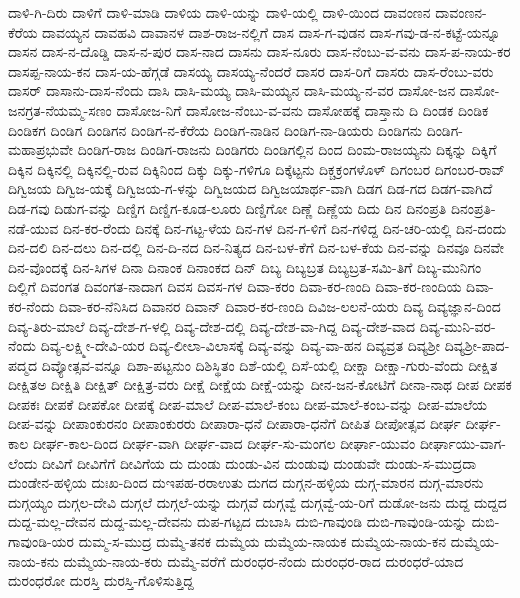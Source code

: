 ದಾಳಿ-ಗಿ-ದಿರು
ದಾಳಿಗೆ
ದಾಳಿ-ಮಾಡಿ
ದಾಳಿಯ
ದಾಳಿ-ಯನ್ನು
ದಾಳಿ-ಯಲ್ಲಿ
ದಾಳಿ-ಯಿಂದ
ದಾವಂಣನ
ದಾವಂಣನ-ಕೆರೆಯ
ದಾವಯ್ಯನ
ದಾವಹವಿ
ದಾವಾನಳ
ದಾಶ-ರಾಜ-ನಲ್ಲಿಗೆ
ದಾಸ
ದಾಸ-ಗ-ವುಡನ
ದಾಸ-ಗವು-ಡ-ನ-ಕಟ್ಟೆ-ಯನ್ನೂ
ದಾಸನ
ದಾಸ-ನ-ದೊಡ್ಡಿ
ದಾಸ-ನ-ಪುರ
ದಾಸ-ನಾದ
ದಾಸನು
ದಾಸ-ನೂರು
ದಾಸ-ನೆಂಬು-ವ-ವನು
ದಾಸ-ಪ-ನಾಯ-ಕರ
ದಾಸಪ್ಪ-ನಾಯ-ಕನ
ದಾಸ-ಯ-ಹೆಗ್ಗಡೆ
ದಾಸಯ್ಯ
ದಾಸಯ್ಯ-ನೆಂದರೆ
ದಾಸರ
ದಾಸ-ರಿಗೆ
ದಾಸರು
ದಾಸ-ರೆಂಬು-ವರು
ದಾಸರ್
ದಾಸಾನು-ದಾಸ-ನೆಂದು
ದಾಸಿ
ದಾಸಿ-ಮಯ್ಯ
ದಾಸಿ-ಮಯ್ಯನ
ದಾಸಿ-ಮಯ್ಯ-ನ-ವರ
ದಾಸೋ-ಜನ
ದಾಸೋ-ಜನಗ್ರತ-ನೆಯಮ್ಮ-ಸಣಂ
ದಾಸೋಜ-ನಿಗೆ
ದಾಸೋಜ-ನೆಂಬು-ವ-ವನು
ದಾಸೋಹಕ್ಕೆ
ದಾಸ್ತಾನು
ದಿ
ದಿಂಡಕ
ದಿಂಡಿಕ
ದಿಂಡಿಕಗ
ದಿಂಡಿಗ
ದಿಂಡಿಗನ
ದಿಂಡಿಗ-ನ-ಕೆರೆಯ
ದಿಂಡಿಗ-ನಾಡಿನ
ದಿಂಡಿಗ-ನಾ-ಡಿಯರು
ದಿಂಡಿಗನು
ದಿಂಡಿಗ-ಮಹಾಪ್ರಭುವೇ
ದಿಂಡಿಗ-ರಾಜ
ದಿಂಡಿಗ-ರಾಜನು
ದಿಂಡಿಗರು
ದಿಂಡಿಗಲ್ಲಿನ
ದಿಂದ
ದಿಂಮ-ರಾಜಯ್ಯನು
ದಿಕ್ಕನ್ನು
ದಿಕ್ಕಿಗೆ
ದಿಕ್ಕಿನ
ದಿಕ್ಕಿನಲ್ಲಿ
ದಿಕ್ಕಿನಲ್ಲಿ-ರುವ
ದಿಕ್ಕಿನಿಂದ
ದಿಕ್ಕು
ದಿಕ್ಕು-ಗಳಿಗೂ
ದಿಕ್ಕೆಟ್ಟನು
ದಿಕ್ಚಕ್ರಂಗಳೊಳ್
ದಿಗಂಬರ
ದಿಗಂಬರ-ರಾವ್
ದಿಗ್ವಿಜಯ
ದಿಗ್ವಿಜ-ಯಕ್ಕೆ
ದಿಗ್ವಿಜಯ-ಗ-ಳನ್ನು
ದಿಗ್ವಿಜಯದ
ದಿಗ್ವಿಜಯಾರ್ಥ-ವಾಗಿ
ದಿಡಗ
ದಿಡ-ಗದ
ದಿಡಗ-ವಾಗಿದೆ
ದಿಡ-ಗವು
ದಿಡುಗ-ವನ್ನು
ದಿಣ್ಡಿಗ
ದಿಣ್ಡಿಗ-ಕೂಡ-ಲೂರು
ದಿಣ್ಡಿಗೋ
ದಿಣ್ಣೆ
ದಿಣ್ಣೆಯ
ದಿದು
ದಿನ
ದಿನಂಪ್ರತಿ
ದಿನಂಪ್ರತಿ-ನಡೆ-ಯುವ
ದಿನ-ಕರ-ರೆಂದು
ದಿನಕ್ಕೆ
ದಿನ-ಗಟ್ಟ-ಳೆಯ
ದಿನ-ಗಳ
ದಿನ-ಗ-ಳಿಗೆ
ದಿನ-ಗಳಿದ್ದ
ದಿನ-ಚರಿ-ಯಲ್ಲಿ
ದಿನ-ದಂದು
ದಿನ-ದಲಿ
ದಿನ-ದಲು
ದಿನ-ದಲ್ಲಿ
ದಿನ-ದಿ-ನದ
ದಿನ-ನಿತ್ಯದ
ದಿನ-ಬಳ-ಕೆಗೆ
ದಿನ-ಬಳ-ಕೆಯ
ದಿನ-ವನ್ನು
ದಿನವೂ
ದಿನವೇ
ದಿನ-ವೊಂದಕ್ಕೆ
ದಿನ-ಸಿಗಳ
ದಿನಾ
ದಿನಾಂಕ
ದಿನಾಂಕದ
ದಿನ್
ದಿಬ್ಯ
ದಿಬ್ಯಬ್ರತ
ದಿಬ್ಯಬ್ರತ-ಸಮಿ-ತಿಗೆ
ದಿಬ್ಯ-ಮುನಿಗಂ
ದಿಲ್ಲಿಗೆ
ದಿವಂಗತ
ದಿವಂಗತ-ನಾದಾಗ
ದಿವಸ
ದಿವಸ-ಗಳ
ದಿವಾ-ಕರಂ
ದಿವಾ-ಕರ-ಣಂದಿ
ದಿವಾ-ಕರ-ಣಂದಿಯ
ದಿವಾ-ಕರ-ನೆಂದು
ದಿವಾ-ಕರ-ನೆನಿಸಿದ
ದಿವಾನರ
ದಿವಾನ್
ದಿವಾರ-ಕರ-ಣಂದಿ
ದಿವಿಜ-ಲಲನೆ-ಯರು
ದಿವ್ಯ
ದಿವ್ಯಜ್ಞಾನ-ದಿಂದ
ದಿವ್ಯ-ತಿರು-ಮಾಲೆ
ದಿವ್ಯ-ದೇಶ-ಗ-ಳಲ್ಲಿ
ದಿವ್ಯ-ದೇಶ-ದಲ್ಲಿ
ದಿವ್ಯ-ದೇಶ-ವಾ-ಗಿದ್ದ
ದಿವ್ಯ-ದೇಶ-ವಾದ
ದಿವ್ಯ-ಮುನಿ-ವರ-ನೆಂದು
ದಿವ್ಯ-ಲಕ್ಷ್ಮೀ-ದೇವಿ-ಯರ
ದಿವ್ಯ-ಲೀಲಾ-ವಿಲಾಸಕ್ಕೆ
ದಿವ್ಯ-ವನ್ನು
ದಿವ್ಯ-ವಾ-ಹನ
ದಿವ್ಯವ್ರತ
ದಿವ್ಯಶ್ರೀ
ದಿವ್ಯಶ್ರೀ-ಪಾದ-ಪದ್ಮದ
ದಿವ್ಯೋತ್ಸವ-ವನ್ನೂ
ದಿಶಾ-ಪಟ್ಟನುಂ
ದಿಶಿಸ್ಥಿತಂ
ದಿಶೆ-ಯಲ್ಲಿ
ದಿಸೆ-ಯಲ್ಲಿ
ದೀಕ್ಷಾ
ದೀಕ್ಷಾ-ಗುರು-ವೆಂದು
ದೀಕ್ಷಿತ
ದೀಕ್ಷಿತಅ
ದೀಕ್ಷಿತಿ
ದೀಕ್ಷಿತ್
ದೀಕ್ಷಿತ್ರ-ವರು
ದೀಕ್ಷೆ
ದೀಕ್ಷೆಯ
ದೀಕ್ಷೆ-ಯನ್ನು
ದೀನ-ಜನ-ಕೋಟಿಗೆ
ದೀನಾ-ನಾಥ
ದೀಪ
ದೀಪಕ
ದೀಪಕಃ
ದೀಪಕೆ
ದೀಪಕೋ
ದೀಪಕ್ಕೆ
ದೀಪ-ಮಾಲೆ
ದೀಪ-ಮಾಲೆ-ಕಂಬ
ದೀಪ-ಮಾಲೆ-ಕಂಬ-ವನ್ನು
ದೀಪ-ಮಾಲೆಯ
ದೀಪ-ವನ್ನು
ದೀಪಾಂಕುರನಂ
ದೀಪಾಂಕುರರು
ದೀಪಾರಾ-ಧನೆ
ದೀಪಾರಾ-ಧನೆಗೆ
ದೀಪಿತ
ದೀಪೋತ್ಸವ
ದೀರ್ಘ
ದೀರ್ಘ-ಕಾಲ
ದೀರ್ಘ-ಕಾಲ-ದಿಂದ
ದೀರ್ಘ-ವಾಗಿ
ದೀರ್ಘ-ವಾದ
ದೀರ್ಘ-ಸು-ಮಂಗಲ
ದೀರ್ಘಾ-ಯುವಂ
ದೀರ್ಘಾಯು-ವಾಗ-ಲೆಂದು
ದೀವಿಗೆ
ದೀವಿಗೆಗೆ
ದೀವಿಗೆಯ
ದು
ದುಂಡು
ದುಂಡು-ವಿನ
ದುಂಡುವು
ದುಂಡುವೇ
ದುಂಡು-ಸ-ಮುದ್ರದಾ
ದುಂಡೇನ-ಹಳ್ಳಿಯ
ದುಃಖ-ದಿಂದ
ದುಇಪಹ-ರರಾಉತು
ದುಗದ
ದುಗ್ಗನ-ಹಳ್ಳಿಯ
ದುಗ್ಗ-ಮಾರನ
ದುಗ್ಗ-ಮಾರನು
ದುಗ್ಗಯ್ಯಂ
ದುಗ್ಗಲ-ದೇವಿ
ದುಗ್ಗಲೆ
ದುಗ್ಗಲೆ-ಯನ್ನು
ದುಗ್ಗವೆ
ದುಗ್ಗವ್ವೆ
ದುಗ್ಗವ್ವೆ-ಯ-ರಿಗೆ
ದುಡೋ-ಜನು
ದುದ್ದ
ದುದ್ದದ
ದುದ್ದ-ಮಲ್ಲ-ದೇವನ
ದುದ್ದ-ಮಲ್ಲ-ದೇವನು
ದುಪ-ಗಟ್ಟದ
ದುಬಾಸಿ
ದುಬಿ-ಗಾವುಂಡಿ
ದುಬಿ-ಗಾವುಂಡಿ-ಯನ್ನು
ದುಬಿ-ಗಾವುಂಡಿ-ಯರ
ದುಮ್ಮ-ಸ-ಮುದ್ರ
ದುಮ್ಮೆ-ತನಕ
ದುಮ್ಮೆಯ
ದುಮ್ಮೆಯ-ನಾಯಕ
ದುಮ್ಮೆಯ-ನಾಯ-ಕನ
ದುಮ್ಮೆಯ-ನಾಯ-ಕನು
ದುಮ್ಮೆಯ-ನಾಯ-ಕರು
ದುಮ್ಮೆ-ವರೆಗೆ
ದುರಂಧರ-ನೆಂದು
ದುರಂಧರ-ರಾದ
ದುರಂಧರೆ-ಯಾದ
ದುರಂಧರೋ
ದುರಸ್ತಿ
ದುರಸ್ತಿ-ಗೊಳಿಸುತ್ತಿದ್ದ
